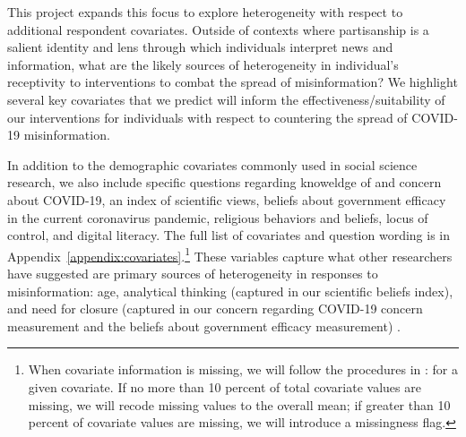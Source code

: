 \documentclass[letterpaper, 12pt, parskip=full,]{scrartcl}
\begin{document}
This project expands this focus to explore heterogeneity with respect to additional respondent covariates. Outside of contexts where partisanship is a salient identity and lens through which individuals interpret news and information, what are the likely sources of heterogeneity in individual's receptivity to interventions to combat the spread of misinformation? We highlight several key covariates that we predict will inform the effectiveness/suitability of our interventions for individuals with respect to countering the spread of COVID-19 misinformation. 


In addition to the demographic covariates commonly used in social science research, we also include specific questions regarding knoweldge of and concern about COVID-19, an index of scientific views, beliefs about government efficacy in the current coronavirus pandemic, religious behaviors and beliefs, locus of control, and digital literacy. The full list of covariates and question wording is in Appendix~\ref{appendix:covariates}.\footnote{When covariate information is missing, we will follow the procedures in \cite{greensop1.05}: for a given covariate. If no more than 10 percent of total covariate values are missing, we will recode missing values to the overall mean; if greater than 10 percent of covariate values are missing, we will introduce a missingness flag.}  %
These variables capture what other researchers have suggested are primary sources of heterogeneity in responses to misinformation: age, analytical thinking (captured in our scientific beliefs index), and need for closure (captured in our concern regarding COVID-19 concern measurement and the beliefs about government efficacy measurement) \citep{wittenberg2020misinformation}. 



\end{document}

